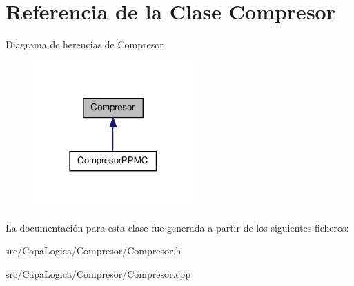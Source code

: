 \hypertarget{class_compresor}{\section{\-Referencia de la \-Clase \-Compresor}
\label{class_compresor}
}


\-Diagrama de herencias de \-Compresor
\nopagebreak
\begin{figure}[H]
\begin{center}
\leavevmode
\includegraphics[width=174pt]{class_compresor__inherit__graph}
\end{center}
\end{figure}


\-La documentación para esta clase fue generada a partir de los siguientes ficheros\-:\begin{DoxyCompactItemize}
\item 
src/\-Capa\-Logica/\-Compresor/\-Compresor.\-h\item 
src/\-Capa\-Logica/\-Compresor/\-Compresor.\-cpp\end{DoxyCompactItemize}
